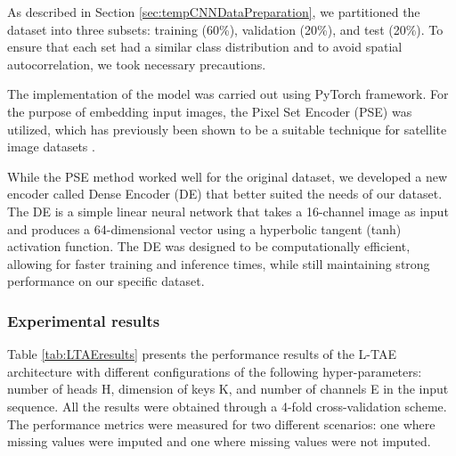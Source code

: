 As described in Section \ref{sec:tempCNNDataPreparation}, we partitioned the dataset into three subsets: training (60\%), validation (20\%), and test (20\%). 
To ensure that each set had a similar class distribution and to avoid spatial autocorrelation, we took necessary precautions.

The implementation of the model was carried out using PyTorch framework. For the purpose of embedding input images, the Pixel Set Encoder (PSE) was utilized, which has previously been shown to be a suitable technique for satellite image datasets \cite{garnot2020satellite}.

While the PSE method worked well for the original dataset, we developed a new encoder called Dense Encoder (DE) that better suited the needs of our dataset.
The DE is a simple linear neural network that takes a 16-channel image as input and produces a 64-dimensional vector using a hyperbolic tangent (tanh) activation function. 
The DE was designed to be computationally efficient, allowing for faster training and inference times, while still maintaining strong performance on our specific dataset.


\subsubsection{Experimental results}

Table \ref{tab:LTAEresults} presents the performance results of the L-TAE architecture with different configurations of the following hyper-parameters: number of heads H, dimension of keys K, and number of channels E in the input sequence.
All the results were obtained through a 4-fold cross-validation scheme.
The performance metrics were measured for two different scenarios: one where missing values were imputed and one where missing values were not imputed.

